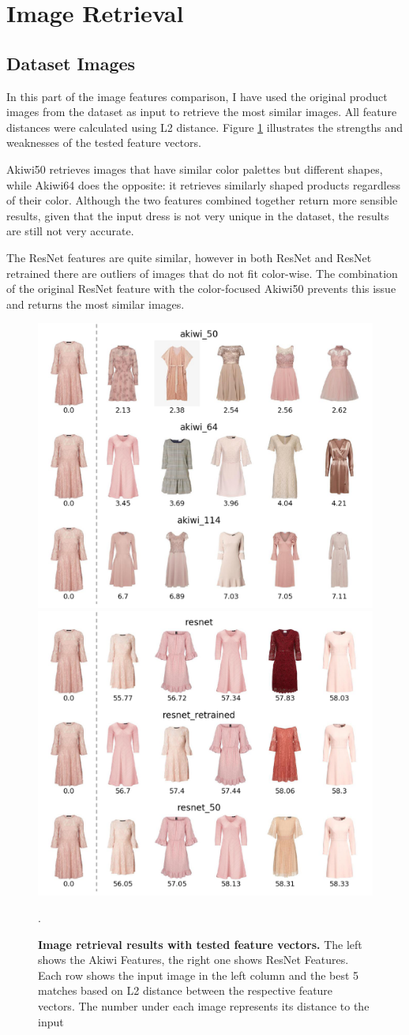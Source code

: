 \documentclass[12pt]{report}
\begin{document}
\section{Image Retrieval}

\subsection{Dataset Images}
In this part of the image features comparison, I have used the original product images from the dataset as input to retrieve the most similar images. All feature distances were calculated using L2 distance. Figure \ref{fig:search_pink} illustrates the strengths and weaknesses of the tested feature vectors. 

Akiwi50 retrieves images that have similar color palettes but different shapes, while Akiwi64 does the opposite: it retrieves similarly shaped products regardless of their color. Although the two features combined together return more sensible results, given that the input dress is not very unique in the dataset, the results are still not very accurate. 

The ResNet features are quite similar, however in both ResNet and ResNet retrained there are outliers of images that do not fit color-wise. The combination of the original ResNet feature with the color-focused Akiwi50 prevents this issue and returns the most similar images. 

\begin{figure}[h]
\centering
{\includegraphics[width=.48\linewidth]{04_experiments/retrieval/akiwi_pink}}\hspace{0.2cm}
{\includegraphics[width=.48\linewidth]{04_experiments/retrieval/resnet_pink}}
\caption{\label{fig:search_pink} \textbf{Image retrieval results with tested feature vectors.} The left shows the Akiwi Features, the right one shows ResNet Features. Each row shows the input image in the left column and the best 5 matches based on L2 distance between the respective feature vectors. The number under each image represents its distance to the input}.
\end{figure}
\end{document}
